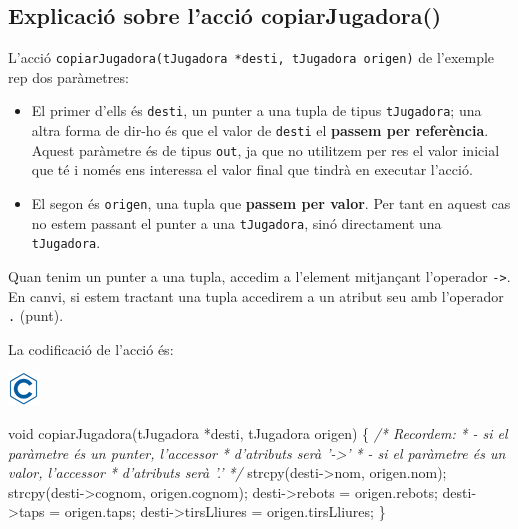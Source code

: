 \documentclass[]{book}
\newenvironment{Shaded}{\begin{snugshade}}{\end{snugshade}}
\newcommand{\DataTypeTok}[1]{\textcolor[rgb]{0.13,0.29,0.53}{#1}}
\newcommand{\CommentTok}[1]{\textcolor[rgb]{0.56,0.35,0.01}{\textit{#1}}}
\newcommand{\NormalTok}[1]{#1}
\providecommand{\tightlist}{%
  \setlength{\itemsep}{0pt}\setlength{\parskip}{0pt}}
\begin{document}
\subsection{Explicació sobre l'acció
copiarJugadora()}\label{explicacio-sobre-laccio-copiarjugadora}

L'acció \texttt{copiarJugadora(tJugadora\ *desti,\ tJugadora\ origen)}
de l'exemple rep dos paràmetres:

\begin{itemize}
\tightlist
\item
  El primer d'ells és \texttt{desti}, un punter a una tupla de tipus
  \texttt{tJugadora}; una altra forma de dir-ho és que el valor de
  \texttt{desti} el \textbf{passem per referència}. Aquest paràmetre és
  de tipus \texttt{out}, ja que no utilitzem per res el valor inicial
  que té i només ens interessa el valor final que tindrà en executar
  l'acció.
\item
  El segon és \texttt{origen}, una tupla que \textbf{passem per valor}.
  Per tant en aquest cas no estem passant el punter a una
  \texttt{tJugadora}, sinó directament una \texttt{tJugadora}.
\end{itemize}

Quan tenim un punter a una tupla, accedim a l'element mitjançant
l'operador \texttt{-\textgreater{}}. En canvi, si estem tractant una
tupla accedirem a un atribut seu amb l'operador \texttt{.} (punt).

La codificació de l'acció és:

\includegraphics{./img/c.png}

\begin{Shaded}
\begin{Highlighting}[]
\DataTypeTok{void}\NormalTok{ copiarJugadora(tJugadora *desti, tJugadora origen) \{}
    \CommentTok{/* Recordem: }
\CommentTok{     * - si el paràmetre és un punter, l'accessor }
\CommentTok{     *   d'atributs serà '->'}
\CommentTok{     * - si el paràmetre és un valor, l'accessor}
\CommentTok{     *   d'atributs serà '.'}
\CommentTok{     */}
\NormalTok{    strcpy(desti->nom, origen.nom);}
\NormalTok{    strcpy(desti->cognom, origen.cognom);}
\NormalTok{    desti->rebots = origen.rebots;}
\NormalTok{    desti->taps = origen.taps;}
\NormalTok{    desti->tirsLliures = origen.tirsLliures;}
\NormalTok{\}}
\end{Highlighting}
\end{Shaded}
\end{document}
